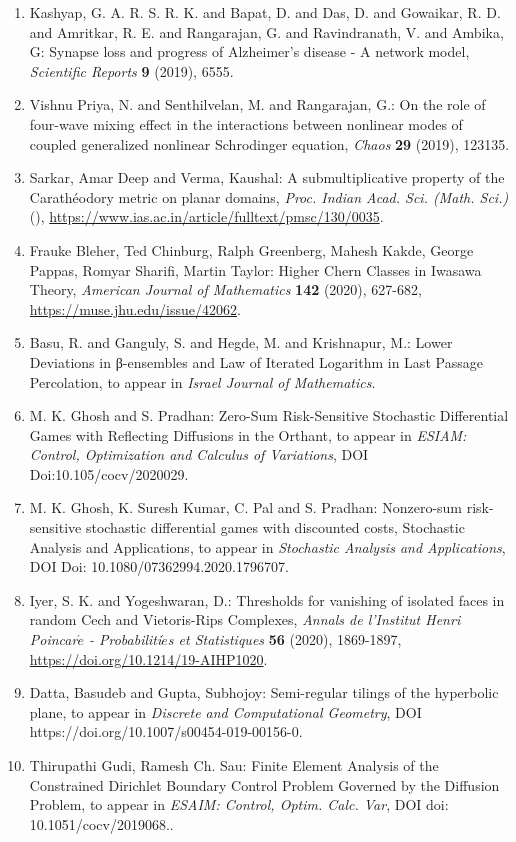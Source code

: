 \begin{enumerate}
\item Kashyap, G. A. R. S. R. K. and Bapat, D. and Das, D. and Gowaikar, R. D. and Amritkar, R. E. and Rangarajan, G. and Ravindranath, V. and Ambika, G: Synapse loss and progress of Alzheimer’s disease - A network model, \emph{Scientific Reports} {\bf 9} (2019), 6555.
\item Vishnu Priya, N. and Senthilvelan, M. and Rangarajan, G.: On the role of four-wave mixing effect in the interactions between nonlinear modes of coupled generalized nonlinear Schrodinger equation, \emph{Chaos} {\bf 29} (2019), 123135.
\item Sarkar, Amar Deep and Verma, Kaushal: A submultiplicative property of the Carath\'{e}odory metric on planar domains, \emph{Proc. Indian Acad. Sci. (Math. Sci.)} {\bf } (), \url{https://www.ias.ac.in/article/fulltext/pmsc/130/0035}.
\item Frauke Bleher, Ted Chinburg, Ralph Greenberg, Mahesh Kakde, George Pappas, Romyar Sharifi, Martin Taylor: Higher Chern Classes in Iwasawa Theory, \emph{American Journal of Mathematics} {\bf 142} (2020), 627-682, \url{https://muse.jhu.edu/issue/42062}.
\item Basu, R. and Ganguly, S. and Hegde, M. and Krishnapur, M.: Lower Deviations in β-ensembles and Law of Iterated Logarithm in Last Passage Percolation, to appear in \emph{Israel Journal of Mathematics}.
\item M. K. Ghosh and S. Pradhan: Zero-Sum Risk-Sensitive Stochastic Differential Games with Reflecting Diffusions in the Orthant, to appear in \emph{ESIAM: Control, Optimization and Calculus of Variations}, DOI Doi:10.105/cocv/2020029.
\item M. K. Ghosh, K. Suresh Kumar, C. Pal and S. Pradhan: Nonzero-sum risk-sensitive stochastic differential games with discounted costs, Stochastic Analysis and Applications, to appear in \emph{Stochastic Analysis and Applications}, DOI Doi: 10.1080/07362994.2020.1796707.
\item Iyer, S. K. and Yogeshwaran, D.: Thresholds for vanishing of isolated faces in random Cech and Vietoris-Rips Complexes, \emph{Annals de l'Institut Henri Poincar$\acute{e}$ - Probabiliti$\acute{e}$s et Statistiques} {\bf 56} (2020), 1869-1897, \url{https://doi.org/10.1214/19-AIHP1020}.
\item Datta, Basudeb and Gupta, Subhojoy: Semi-regular tilings of the hyperbolic plane, to appear in \emph{Discrete and Computational Geometry}, DOI https://doi.org/10.1007/s00454-019-00156-0.
\item Thirupathi Gudi, Ramesh Ch. Sau: Finite Element Analysis of the Constrained Dirichlet Boundary Control Problem Governed by the Diffusion Problem, to appear in \emph{ESAIM: Control, Optim. Calc. Var}, DOI doi: 10.1051/cocv/2019068..

\end{enumerate}
